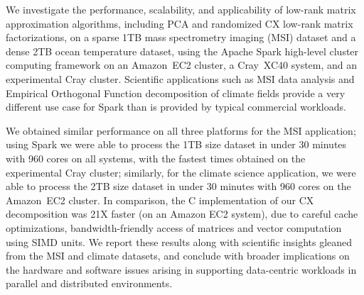 We investigate the performance, scalability, and applicability of low-rank
matrix approximation algorithms, including PCA and randomized CX low-rank
matrix factorizations, on a sparse 1TB mass spectrometry imaging (MSI) dataset
and a dense 2TB ocean temperature dataset, using the Apache Spark high-level
cluster computing framework on an Amazon~EC2 cluster, a Cray~XC40 system, and
an experimental Cray cluster. Scientific applications such as MSI data
analysis and Empirical Orthogonal Function decomposition of climate fields
provide a very different use case for Spark than is provided by typical commercial
workloads.

We obtained similar performance on all three platforms
for the MSI application; using Spark we were able to process the 1TB size
dataset in under 30 minutes with 960 cores on all systems, with the fastest
times obtained on the experimental Cray cluster; similarly, for the climate
science application, we were able to process the 2TB size dataset in under 30
minutes with 960 cores on the Amazon~EC2 cluster. In comparison, the C
implementation of our CX decomposition was 21X faster (on an Amazon EC2
system), due to careful cache optimizations, bandwidth-friendly access of
matrices and vector computation using SIMD units. 
We report these results along with scientific insights gleaned from the
MSI and climate datasets, and conclude with broader implications on the
hardware and software issues arising in supporting data-centric workloads in
parallel and distributed environments.
